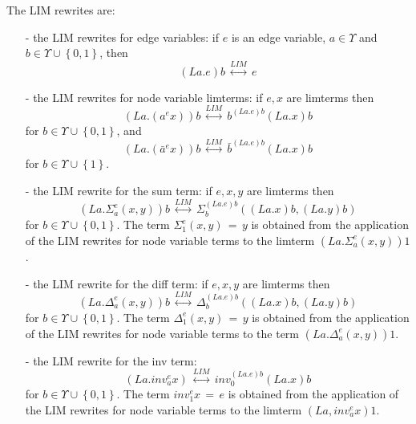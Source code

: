 \begin{definition}
The LIM rewrites are: 
\begin{enumerate}
\item[-] the LIM rewrites for edge variables: if $e$ is an edge variable, $a \in \Upsilon$ and $\displaystyle b \in \Upsilon \cup \left\{ 0 , 1 \right\}$, then $$(La.e)b \, \stackrel{LIM}{\longleftrightarrow} \, e$$  
\item[-] the LIM rewrites for node variable limterms: if $e, x$ are limterms then 
$$\displaystyle \left(La.\left(a^{e} x\right)\right) b  \, \stackrel{LIM}{\longleftrightarrow} \, b^{(La.e)b} (La.x)b$$ for $\displaystyle b \in \Upsilon \cup \left\{ 0 , 1 \right\}$, and  
$$\displaystyle \left(La.\left(\bar{a}^{e} x\right)\right) b  \, \stackrel{LIM}{\longleftrightarrow} \, \bar{b}^{(La.e)b} (La.x)b$$ for $\displaystyle b \in \Upsilon \cup \left\{  1 \right\}$. 
\item[-] the LIM rewrite for the sum term: if $e, x, y$ are limterms then 
$$\displaystyle \left( La.\Sigma_{a}^{e}(x,y) \right) b \, \stackrel{LIM}{\longleftrightarrow} \, \Sigma_{b}^{(La.e)b}((La.x)b,(La.y)b)$$ for $\displaystyle b \in \Upsilon \cup \left\{ 0 , 1 \right\}$. 
The term $\displaystyle \Sigma_{1}^{e} (x,y) \, = \, y$ is obtained from the application of the LIM rewrites for node variable terms to the limterm $\displaystyle (La.\Sigma_{a}^{e}(x,y)) 1$. 
\item[-] the LIM rewrite for the diff term: if $e, x, y$ are limterms then $$\displaystyle \left( La.\Delta_{a}^{e}(x,y)\right)b \, \stackrel{LIM}{\longleftrightarrow} \, \Delta_{b}^{(La.e)b}((La.x)b,(La.y)b)$$ for $\displaystyle b \in \Upsilon \cup \left\{ 0 , 1 \right\}$. 
The term $\displaystyle \Delta_{1}^{e} (x,y) \, = \, y$ is obtained from the application of the LIM rewrites for node variable terms to the term $\displaystyle (La.\Delta_{a}^{e}(x,y)) 1$. 
\item[-] the LIM rewrite for the inv term: $$\displaystyle \left(La.inv_{a}^{e} x\right) \, \stackrel{LIM}{\longleftrightarrow} \, inv_{0}^{(La.e)b} (La.x)b$$ for $\displaystyle b \in \Upsilon \cup \left\{ 0 , 1 \right\}$. The term $\displaystyle inv_{1}^{e} x  \, = \, e$ is obtained from the application of the LIM rewrites for node variable terms to the limterm $\displaystyle (La,inv_{a}^{e} x) 1$. 
\end{enumerate}

\end{definition}
